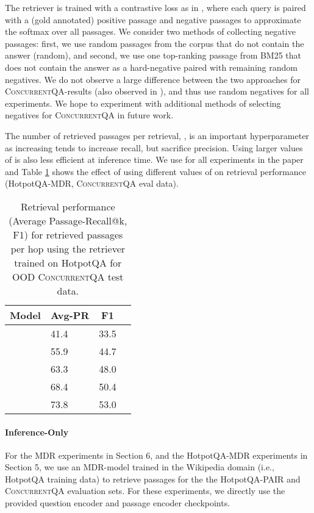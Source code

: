 \documentclass{article}
\renewcommand\cite{\citep}	\newcommand\shortcite{\citeyearpar}\newcommand\newcite{\citet}
\newcommand{\datasetname}{\textsc{ConcurrentQA}\xspace}
\newcommand{\problemshortname}{\textsc{PAIR}\xspace}
\begin{document}
The retriever is trained with a contrastive loss as in \citet{karpukhin2020dpr}, where each query is paired with a (gold annotated) positive passage and  negative passages to approximate the softmax over all passages. We consider two methods of collecting negative passages: first, we use random passages from the corpus that do not contain the answer (random), and second, we use one top-ranking passage from BM25 that does not contain the answer as a hard-negative paired with remaining random negatives. We do not observe a large difference between the two approaches for \datasetname-results (also observed in \cite{xiong2021mdr}), and thus use random negatives for all experiments. We hope to experiment with additional methods of selecting negatives for \datasetname in future work.


The number of retrieved passages per retrieval, , is an important hyperparameter as increasing  tends to increase recall, but sacrifice precision. Using larger values of  is also less efficient at inference time. We use  for all experiments in the paper and Table \ref{tab:mdr_varyk} shows the effect of using different values of  on retrieval performance (HotpotQA-MDR, \datasetname eval data).

\begin{table}[t!]
    \begin{center}
    \normalsize
    \begin{tabular}{llcc}
    \toprule
    Model  &    Avg-PR   & F1 \\
    \midrule
           & 41.4  & 33.5 \\
          & 55.9 &  44.7 \\
          & 63.3  & 48.0 \\
          & 68.4  & 50.4 \\
         & 73.8  & 53.0 \\
    \bottomrule
    \end{tabular}
    \normalsize
    \caption{Retrieval performance (Average Passage-Recall@k, F1) for  retrieved passages per hop using the retriever trained on HotpotQA for OOD \datasetname test data.}
    \vspace{2mm}
    \label{tab:mdr_varyk}
    \end{center}
\end{table}
\paragraph{Inference-Only} For the MDR experiments in Section 6, and the HotpotQA-MDR experiments in Section 5, we use an MDR-model trained in the Wikipedia domain (i.e., HotpotQA training data) to retrieve passages for the the HotpotQA-\problemshortname and \datasetname evaluation sets. For these experiments, we directly use the provided question encoder and passage encoder checkpoints. 
\end{document}
